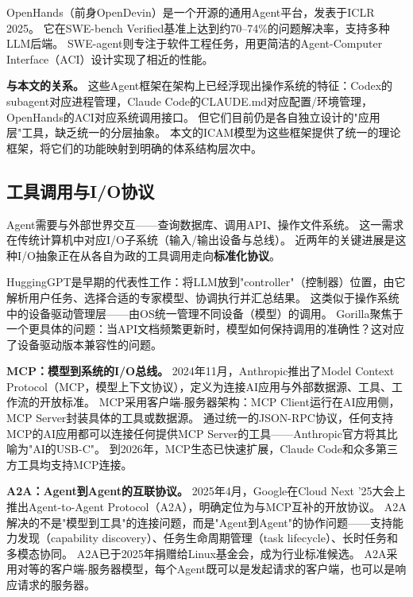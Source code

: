 OpenHands\cite{openhands_paper_2025}（前身OpenDevin）是一个开源的通用Agent平台，发表于ICLR 2025。
它在SWE-bench Verified基准上达到约70--74\%的问题解决率\cite{swebench2023}，支持多种LLM后端。
SWE-agent\cite{sweagent2024}则专注于软件工程任务，用更简洁的Agent-Computer Interface（ACI）设计实现了相近的性能。

\textbf{与本文的关系。}
这些Agent框架在架构上已经浮现出操作系统的特征：Codex的subagent对应进程管理，Claude Code的CLAUDE.md对应配置/环境管理，OpenHands的ACI对应系统调用接口。
但它们目前仍是各自独立设计的"应用层"工具，缺乏统一的分层抽象。
本文的ICAM模型为这些框架提供了统一的理论框架，将它们的功能映射到明确的体系结构层次中。

\subsection{工具调用与I/O协议}
\label{sec:related-io}

Agent需要与外部世界交互——查询数据库、调用API、操作文件系统。
这一需求在传统计算机中对应I/O子系统（输入/输出设备与总线）。
近两年的关键进展是这种I/O抽象正在从各自为政的工具调用走向\textbf{标准化协议}。

HuggingGPT\cite{hugginggpt2023}是早期的代表性工作：将LLM放到"controller"（控制器）位置，由它解析用户任务、选择合适的专家模型、协调执行并汇总结果。
这类似于操作系统中的设备驱动管理层——由OS统一管理不同设备（模型）的调用。
Gorilla\cite{patil2024gorilla}聚焦于一个更具体的问题：当API文档频繁更新时，模型如何保持调用的准确性？这对应了设备驱动版本兼容性的问题。

\textbf{MCP：模型到系统的I/O总线。}
2024年11月，Anthropic推出了Model Context Protocol（MCP，模型上下文协议）\cite{mcp_intro_2026}，定义为连接AI应用与外部数据源、工具、工作流的开放标准。
MCP采用客户端-服务器架构：MCP Client运行在AI应用侧，MCP Server封装具体的工具或数据源。
通过统一的JSON-RPC协议，任何支持MCP的AI应用都可以连接任何提供MCP Server的工具——Anthropic官方将其比喻为"AI的USB-C"。
到2026年，MCP生态已快速扩展，Claude Code\cite{anthropic_claudecode_mcp_2026}和众多第三方工具均支持MCP连接。

\textbf{A2A：Agent到Agent的互联协议。}
2025年4月，Google在Cloud Next '25大会上推出Agent-to-Agent Protocol（A2A）\cite{google_a2a_2025}，明确定位为与MCP互补的开放协议。
A2A解决的不是"模型到工具"的连接问题，而是"Agent到Agent"的协作问题——支持能力发现（capability discovery）、任务生命周期管理（task lifecycle）、长时任务和多模态协同。
A2A已于2025年捐赠给Linux基金会，成为行业标准候选。
A2A采用对等的客户端-服务器模型，每个Agent既可以是发起请求的客户端，也可以是响应请求的服务器。

